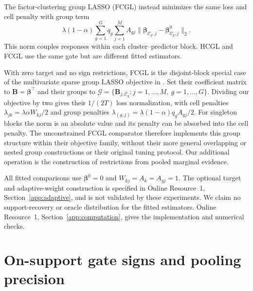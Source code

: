 \documentclass[lineno,pdflatex,sn-basic]{sn-jnl}
\theoremstyle{thmstyleone}
\begin{document}
The factor-clustering group LASSO (FCGL) instead minimizes the same loss and
cell penalty with group term
\begin{equation}\label{eq:fcgl-penalty}
	\lambda(1-\alpha)\sum_{g=1}^G q_g
	\sum_{j=1}^M A_{gj}
	\bigl\|\bm\beta_{\mathcal C_g,j}
	-\bm\beta^0_{\mathcal C_g,j}\bigr\|_2 .
\end{equation}
This norm couples responses within each cluster--predictor block. HCGL and
FCGL use the same gate but are different fitted estimators.

With zero target and no sign restrictions, FCGL is the disjoint-block
special case of the multivariate sparse group LASSO objective in
\citet[Equation~(2)]{Li+Nan+Zhu:2015}. Set their coefficient matrix to
$\bm B=\bm\beta^\top$ and their groups to
$\mathcal G=\{\bm B_{j,\mathcal C_g}:j=1,\ldots,M,\ g=1,\ldots,G\}$.
Dividing our objective by two gives their $1/(2T)$ loss normalization,
with cell penalties $\lambda_{jk}=\lambda\alpha W_{kj}/2$ and group
penalties $\lambda_{(g,j)}=\lambda(1-\alpha)q_gA_{gj}/2$.
For singleton blocks the norm is an absolute value and its penalty can be
absorbed into the cell penalty. The unconstrained FCGL comparator therefore
implements this group structure within their objective family, without their
more general overlapping or nested group constructions or their original
tuning protocol. Our additional operation is the construction
of restrictions from pooled marginal evidence.

All fitted comparisons use $\bm\beta^0=0$ and
$W_{kj}=A_k=A_{gj}=1$. The optional target and adaptive-weight construction is
specified in Online Resource~1, Section~\ref{app:adaptive}, and is not validated
by these experiments. We claim no support-recovery or oracle distribution for
the fitted estimators. Online Resource~1, Section~\ref{app:computation}, gives
the implementation and numerical checks.

\FloatBarrier
\section{On-support gate signs and pooling precision} \label{sec:theory}
\end{document}
